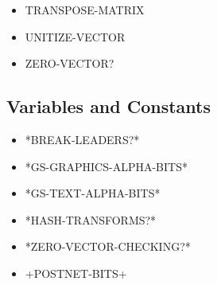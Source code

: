 \documentclass [11pt]{book}
\begin{document}
\begin{itemize}
\item {}TRANSPOSE-MATRIX





\item {}UNITIZE-VECTOR





\item {}ZERO-VECTOR?





\end{itemize}



\subsection{Variables and Constants}

\label{subsec:variablesandconstants}



\begin{itemize}

\item {}*BREAK-LEADERS?*





\item {}*GS-GRAPHICS-ALPHA-BITS*





\item {}*GS-TEXT-ALPHA-BITS*





\item {}*HASH-TRANSFORMS?*





\item {}*ZERO-VECTOR-CHECKING?*





\item {}+POSTNET-BITS+





\end{itemize}
\end{document}
